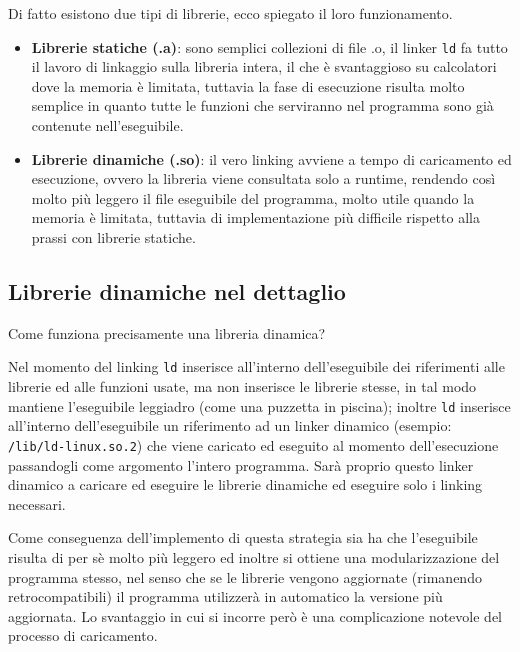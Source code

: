 \documentclass[class=book, crop=false, oneside]{standalone}
\begin{document}
Di fatto esistono due tipi di librerie, ecco spiegato il loro funzionamento.
\begin{itemize}
	\item \textbf{Librerie statiche (.a)}: sono semplici collezioni di file .o, il linker \texttt{ld} fa tutto il lavoro di linkaggio sulla libreria intera, il che è svantaggioso su calcolatori dove la memoria è limitata, tuttavia la fase di esecuzione risulta molto semplice in quanto tutte le funzioni che serviranno nel programma sono già contenute nell'eseguibile.
	\item \textbf{Librerie dinamiche (.so)}: il vero linking avviene a tempo di caricamento ed esecuzione, ovvero la libreria viene consultata solo a runtime, rendendo così molto più leggero il file eseguibile del programma, molto utile quando la memoria è limitata, tuttavia di implementazione più difficile rispetto alla prassi con librerie statiche.
\end{itemize}

\subsection{Librerie dinamiche nel dettaglio}
Come funziona precisamente una libreria dinamica?

Nel momento del linking \texttt{ld} inserisce all'interno dell'eseguibile dei riferimenti alle librerie ed alle funzioni usate, ma non inserisce le librerie stesse, in tal modo mantiene l'eseguibile leggiadro (come una puzzetta in piscina); inoltre \texttt{ld} inserisce all'interno dell'eseguibile un riferimento ad un linker dinamico (esempio: \texttt{/lib/ld-linux.so.2}) che viene caricato ed eseguito al momento dell'esecuzione passandogli come argomento l'intero programma.
Sarà proprio questo linker dinamico a caricare ed eseguire le librerie dinamiche ed eseguire solo i linking necessari.

Come conseguenza dell'implemento di questa strategia sia ha che l'eseguibile risulta di per sè molto più leggero ed inoltre si ottiene una modularizzazione del programma stesso, nel senso che se le librerie vengono aggiornate (rimanendo retrocompatibili) il programma utilizzerà in automatico la versione più aggiornata.
Lo svantaggio in cui si incorre però è una complicazione notevole del processo di caricamento.
\end{document}
